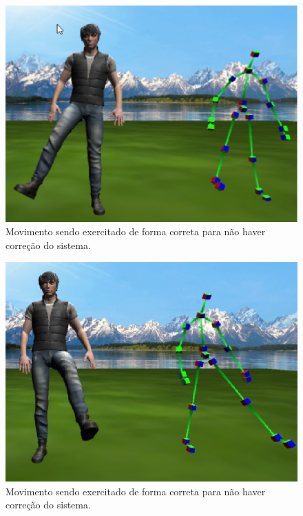   \begin{figure}[H]
  \centering
  \includegraphics [keepaspectratio=true,scale=0.60]{figuras/pernaDireitaCerta.eps}
  \caption{Movimento sendo exercitado de forma correta para não haver correção do sistema.}
  \label{img:pernaDireitaCerta}
  \end{figure}

  \begin{figure}[H]
  \centering
  \includegraphics [keepaspectratio=true,scale=0.60]{figuras/pernaEsquerdaCerta.eps}
  \caption{Movimento sendo exercitado de forma correta para não haver correção do sistema.}
  \label{img:pernaEsquerdaCerta}
  \end{figure}


